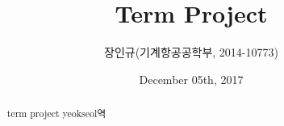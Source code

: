\documentclass[10pt, a4paper]{article}
\begin{document}
\title{Term Project}

\author{장인규(기계항공공학부, 2014-10773)}
\date{December 05th, 2017}
\maketitle

\begin{abstract}

term project yeokseol역

\end{abstract}
\end{document}
